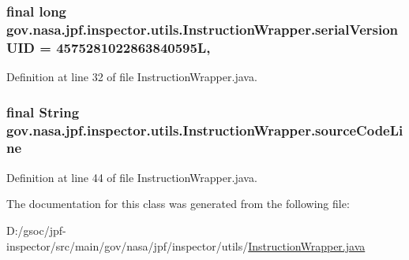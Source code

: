 \subsubsection[{\texorpdfstring{serial\+Version\+U\+ID}{serialVersionUID}}]{\setlength{\rightskip}{0pt plus 5cm}final long gov.\+nasa.\+jpf.\+inspector.\+utils.\+Instruction\+Wrapper.\+serial\+Version\+U\+ID = 4575281022863840595L\hspace{0.3cm}{\ttfamily [static]}, {\ttfamily [private]}}\hypertarget{classgov_1_1nasa_1_1jpf_1_1inspector_1_1utils_1_1_instruction_wrapper_add18559946216bb05c793c23c049792b}{}\label{classgov_1_1nasa_1_1jpf_1_1inspector_1_1utils_1_1_instruction_wrapper_add18559946216bb05c793c23c049792b}


Definition at line 32 of file Instruction\+Wrapper.\+java.

\subsubsection[{\texorpdfstring{source\+Code\+Line}{sourceCodeLine}}]{\setlength{\rightskip}{0pt plus 5cm}final String gov.\+nasa.\+jpf.\+inspector.\+utils.\+Instruction\+Wrapper.\+source\+Code\+Line\hspace{0.3cm}{\ttfamily [private]}}\hypertarget{classgov_1_1nasa_1_1jpf_1_1inspector_1_1utils_1_1_instruction_wrapper_a1cef841e53c018c9f385d13c4a32f377}{}\label{classgov_1_1nasa_1_1jpf_1_1inspector_1_1utils_1_1_instruction_wrapper_a1cef841e53c018c9f385d13c4a32f377}


Definition at line 44 of file Instruction\+Wrapper.\+java.



The documentation for this class was generated from the following file\+:\begin{DoxyCompactItemize}
\item 
D\+:/gsoc/jpf-\/inspector/src/main/gov/nasa/jpf/inspector/utils/\hyperlink{_instruction_wrapper_8java}{Instruction\+Wrapper.\+java}\end{DoxyCompactItemize}
